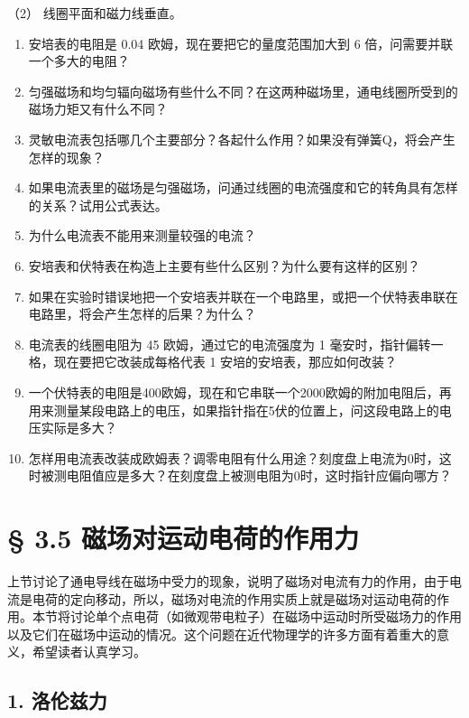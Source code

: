 （2） 线圈平面和磁力线垂直。

\begin{enumerate}
\def\labelenumi{\arabic{enumi}.}
\setcounter{enumi}{8}
\item
  安培表的电阻是 0.04 欧姆，现在要把它的量度范围加大到 6
  倍，问需要并联一个多大的电阻？
\item
  匀强磁场和均匀辐向磁场有些什么不同？在这两种磁场里，通电线圈所受到的磁场力矩又有什么不同？
\item
  灵敏电流表包括哪几个主要部分？各起什么作用？如果没有弹簧Q，将会产生怎样的现象？
\item
  如果电流表里的磁场是匀强磁场，问通过线圈的电流强度和它的转角具有怎样的关系？试用公式表达。
\item
  为什么电流表不能用来测量较强的电流？
\item
  安培表和伏特表在构造上主要有些什么区别？为什么要有这样的区别？
\item
  如果在实验时错误地把一个安培表并联在一个电路里，或把一个伏特表串联在电路里，将会产生怎样的后果？为什么？
\item
  电流表的线圈电阻为 45 欧姆，通过它的电流强度为 1
  毫安时，指针偏转一格，现在要把它改装成每格代表 1
  安培的安培表，那应如何改装？
\item
  一个伏特表的电阻是400欧姆，现在和它串联一个2000欧姆的附加电阻后，再用来测量某段电路上的电压，如果指针指在5伏的位置上，问这段电路上的电压实际是多大？
\item
  怎样用电流表改装成欧姆表？调零电阻有什么用途？刻度盘上电流为0时，这时被测电阻值应是多大？在刻度盘上被测电阻为0时，这时指针应偏向哪方？
\end{enumerate}

\section{§ 3.5
磁场对运动电荷的作用力}\label{ux78c1ux573aux5bf9ux8fd0ux52a8ux7535ux8377ux7684ux4f5cux7528ux529b}

上节讨论了通电导线在磁场中受力的现象，说明了磁场对电流有力的作用，由于电流是电荷的定向移动，所以，磁场对电流的作用实质上就是磁场对运动电荷的作用。本节将讨论单个点电荷（如微观带电粒子）在磁场中运动时所受磁场力的作用以及它们在磁场中运动的情况。这个问题在近代物理学的许多方面有着重大的意义，希望读者认真学习。

\subsection{1. 洛伦兹力}\label{ux6d1bux4f26ux5179ux529b}


